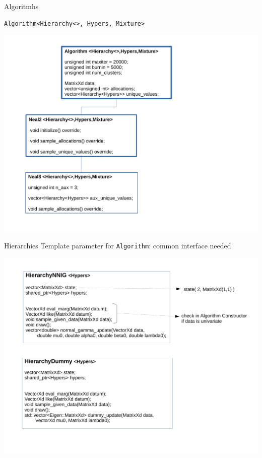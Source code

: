 

\begin{frame}[fragile]{Algoritmhs}
\begin{verbatim}
Algorithm<Hierarchy<>, Hypers, Mixture>
\end{verbatim}
\begin{center}
	\includegraphics[scale=0.35]{etc/algo.pdf}
\end{center}
\end{frame}

\begin{frame}{Hierarchies}
Template parameter for \texttt{Algorithm}: common interface needed
\begin{center}
	\includegraphics[scale=0.35]{etc/hierarchy.pdf}
\end{center}

\end{frame}

